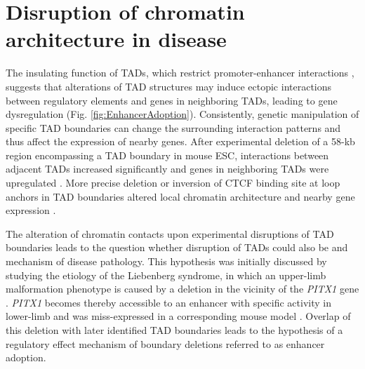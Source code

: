 \documentclass[a4paper,twoside=true,openright,parskip=full,chapterprefix=true,11pt,headings=normal,bibliography=totoc,listof=totoc,titlepage=on,captions=tableabove,draft=false]{scrreprt}
\theoremstyle{definition}
\theoremstyle{definition}
\theoremstyle{definition}
\theoremstyle{remark}
\begin{document}
\hypertarget{disruption-of-chromatin-architecture-in-disease}{%
\section{Disruption of chromatin architecture in
disease}\label{disruption-of-chromatin-architecture-in-disease}}

The insulating function of TADs, which restrict promoter-enhancer
interactions \citep{Symmons2014}, suggests that alterations of TAD
structures may induce ectopic interactions between regulatory elements
and genes in neighboring TADs, leading to gene dysregulation (Fig.
\ref{fig:EnhancerAdoption}). Consistently, genetic manipulation of
specific TAD boundaries can change the surrounding interaction patterns
and thus affect the expression of nearby genes. After experimental
deletion of a 58-kb region encompassing a TAD boundary in mouse ESC,
interactions between adjacent TADs increased significantly and genes in
neighboring TADs were upregulated \citep{Nora2012}. More precise
deletion or inversion of CTCF binding site at loop anchors in TAD
boundaries altered local chromatin architecture and nearby gene
expression \citep{Dowen2014, Guo2015, Narendra2015}.

The alteration of chromatin contacts upon experimental disruptions of
TAD boundaries leads to the question whether disruption of TADs could
also be and mechanism of disease pathology. This hypothesis was
initially discussed by studying the etiology of the Liebenberg syndrome,
in which an upper-limb malformation phenotype is caused by a deletion in
the vicinity of the \emph{PITX1} gene \citep{Spielmann2013a}.
\emph{PITX1} becomes thereby accessible to an enhancer with specific
activity in lower-limb and was miss-expressed in a corresponding mouse
model \citep{Spielmann2012}. Overlap of this deletion with later
identified TAD boundaries leads to the hypothesis of a regulatory effect
mechanism of boundary deletions referred to as enhancer adoption.
\end{document}
